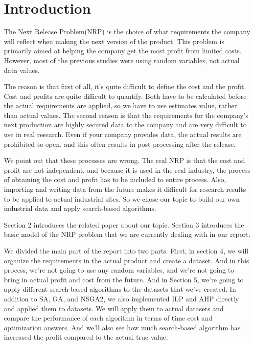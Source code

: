 \section{Introduction}
 The Next Release Problem(NRP) is the choice of what requirements the company will reflect when making the next version of the product. This problem is primarily aimed at helping the company get the most profit from limited costs. However, most of the previous studies were using random variables, not actual data values. 
 
 The reason is that first of all, it's quite difficult to define the cost and the profit. Cost and profits are quite difficult to quantify. Both have to be calculated before the actual requirements are applied, so we have to use estimates value, rather than actual values. The second reason is that the requirements for the company's next production are highly secured data to the company and are very difficult to use in real research. Even if your company provides data, the actual results are prohibited to open, and this often results in post-processing after the release.
 
 We point out that these processes are wrong. The real NRP is that the cost and profit are not independent, and because it is used in the real industry, the process of obtaining the cost and profit has to be included to entire process. Also, importing and writing data from the future makes it difficult for research results to be applied to actual industrial sites. So we chose our topic to build our own industrial data and apply search-based algorithms. 
 
Section 2 introduces the related paper about our topic. Section 3 introduces the basic model of the NRP problem that we are currently dealing with in our report.

We divided the main part of the report into two parts. First, in section 4, we will organize the requirements in the actual product and create a dataset. And in this process, we're not going to use any random variables, and we're not going to bring in actual profit and cost from the future. 
And in Section 5, we're going to apply different search-based algorithms to the datasets that we've created. In addition to SA, GA, and NSGA2, we also implemented ILP and AHP directly and applied them to datasets. We will apply them to actual datasets and compare the performance of each algorithm in terms of time cost and optimization answers. And we'll also see how much search-based algorithm has increased the profit compared to the actual true value.

